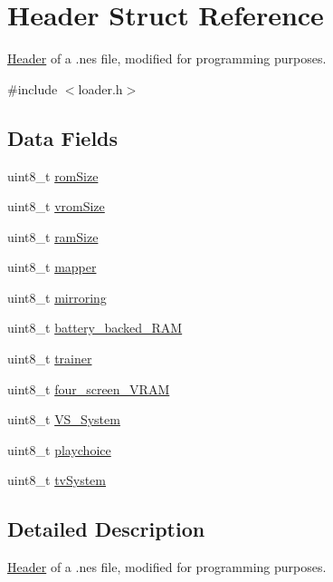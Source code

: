 \hypertarget{struct_header}{}\section{Header Struct Reference}
\label{struct_header}


\hyperlink{struct_header}{Header} of a .nes file, modified for programming purposes.  




{\ttfamily \#include $<$loader.\+h$>$}

\subsection*{Data Fields}
\begin{DoxyCompactItemize}
\item 
uint8\+\_\+t \hyperlink{struct_header_abc17b83f6b13b83428472dfa9221bfb5}{rom\+Size}
\item 
uint8\+\_\+t \hyperlink{struct_header_a10decd110cedd575129373467ebbb23a}{vrom\+Size}
\item 
uint8\+\_\+t \hyperlink{struct_header_a31d9b2a2cceaa5d61eb13f86a040d3ab}{ram\+Size}
\item 
uint8\+\_\+t \hyperlink{struct_header_a0c8e7d5749b619a9832dc135d4661a72}{mapper}
\item 
uint8\+\_\+t \hyperlink{struct_header_ac46680d85e5d1611f934f355080f0375}{mirroring}
\item 
uint8\+\_\+t \hyperlink{struct_header_a46831b0a31a6ac3731c607dc3696f3e8}{battery\+\_\+backed\+\_\+\+R\+AM}
\item 
uint8\+\_\+t \hyperlink{struct_header_a8038f4af17204ad75f2790932777abea}{trainer}
\item 
uint8\+\_\+t \hyperlink{struct_header_a5183c0eb38d0f53f6e8a9c57bf3fe6fd}{four\+\_\+screen\+\_\+\+V\+R\+AM}
\item 
uint8\+\_\+t \hyperlink{struct_header_a23f751e0854a728c81d30b364ed95366}{V\+S\+\_\+\+System}
\item 
uint8\+\_\+t \hyperlink{struct_header_af63447dae4fa0b3b191c17e93d4b8308}{playchoice}
\item 
uint8\+\_\+t \hyperlink{struct_header_a61db4097a2c0c337f74b4b78af94b3bc}{tv\+System}
\end{DoxyCompactItemize}


\subsection{Detailed Description}
\hyperlink{struct_header}{Header} of a .nes file, modified for programming purposes. 


